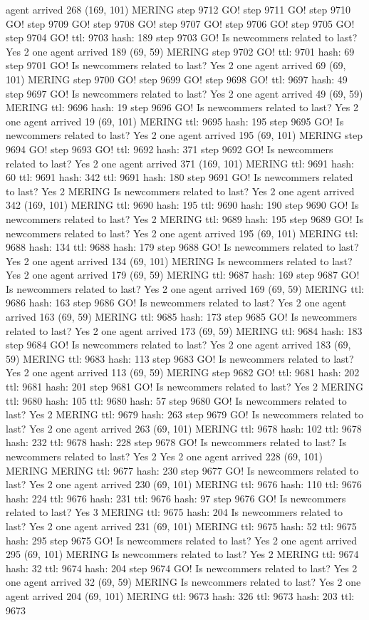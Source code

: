 agent arrived 268 (169, 101) MERING step 9712 GO! step 9711 GO! step 9710 GO! step 9709 GO! step 9708 GO! step 9707 GO! step 9706 GO! step 9705 GO! step 9704 GO! ttl: 9703 hash: 189 step 9703 GO! Is newcommers related to last? Yes 2 one agent arrived 189 (69, 59) MERING step 9702 GO! ttl: 9701 hash: 69 step 9701 GO! Is newcommers related to last? Yes 2 one agent arrived 69 (69, 101) MERING step 9700 GO! step 9699 GO! step 9698 GO! ttl: 9697 hash: 49 step 9697 GO! Is newcommers related to last? Yes 2 one agent arrived 49 (69, 59) MERING ttl: 9696 hash: 19 step 9696 GO! Is newcommers related to last? Yes 2 one agent arrived 19 (69, 101) MERING ttl: 9695 hash: 195 step 9695 GO! Is newcommers related to last? Yes 2 one agent arrived 195 (69, 101) MERING step 9694 GO! step 9693 GO! ttl: 9692 hash: 371 step 9692 GO! Is newcommers related to last? Yes 2 one agent arrived 371 (169, 101) MERING ttl: 9691 hash: 60 ttl: 9691 hash: 342 ttl: 9691 hash: 180 step 9691 GO! Is newcommers related to last? Yes 2 MERING Is newcommers related to last? Yes 2 one agent arrived 342 (169, 101) MERING ttl: 9690 hash: 195 ttl: 9690 hash: 190 step 9690 GO! Is newcommers related to last? Yes 2 MERING ttl: 9689 hash: 195 step 9689 GO! Is newcommers related to last? Yes 2 one agent arrived 195 (69, 101) MERING ttl: 9688 hash: 134 ttl: 9688 hash: 179 step 9688 GO! Is newcommers related to last? Yes 2 one agent arrived 134 (69, 101) MERING Is newcommers related to last? Yes 2 one agent arrived 179 (69, 59) MERING ttl: 9687 hash: 169 step 9687 GO! Is newcommers related to last? Yes 2 one agent arrived 169 (69, 59) MERING ttl: 9686 hash: 163 step 9686 GO! Is newcommers related to last? Yes 2 one agent arrived 163 (69, 59) MERING ttl: 9685 hash: 173 step 9685 GO! Is newcommers related to last? Yes 2 one agent arrived 173 (69, 59) MERING ttl: 9684 hash: 183 step 9684 GO! Is newcommers related to last? Yes 2 one agent arrived 183 (69, 59) MERING ttl: 9683 hash: 113 step 9683 GO! Is newcommers related to last? Yes 2 one agent arrived 113 (69, 59) MERING step 9682 GO! ttl: 9681 hash: 202 ttl: 9681 hash: 201 step 9681 GO! Is newcommers related to last? Yes 2 MERING ttl: 9680 hash: 105 ttl: 9680 hash: 57 step 9680 GO! Is newcommers related to last? Yes 2 MERING ttl: 9679 hash: 263 step 9679 GO! Is newcommers related to last? Yes 2 one agent arrived 263 (69, 101) MERING ttl: 9678 hash: 102 ttl: 9678 hash: 232 ttl: 9678 hash: 228 step 9678 GO! Is newcommers related to last? Is newcommers related to last? Yes 2 Yes 2 one agent arrived 228 (69, 101) MERING MERING ttl: 9677 hash: 230 step 9677 GO! Is newcommers related to last? Yes 2 one agent arrived 230 (69, 101) MERING ttl: 9676 hash: 110 ttl: 9676 hash: 224 ttl: 9676 hash: 231 ttl: 9676 hash: 97 step 9676 GO! Is newcommers related to last? Yes 3 MERING ttl: 9675 hash: 204 Is newcommers related to last? Yes 2 one agent arrived 231 (69, 101) MERING ttl: 9675 hash: 52 ttl: 9675 hash: 295 step 9675 GO! Is newcommers related to last? Yes 2 one agent arrived 295 (69, 101) MERING Is newcommers related to last? Yes 2 MERING ttl: 9674 hash: 32 ttl: 9674 hash: 204 step 9674 GO! Is newcommers related to last? Yes 2 one agent arrived 32 (69, 59) MERING Is newcommers related to last? Yes 2 one agent arrived 204 (69, 101) MERING ttl: 9673 hash: 326 ttl: 9673 hash: 203 ttl: 9673 